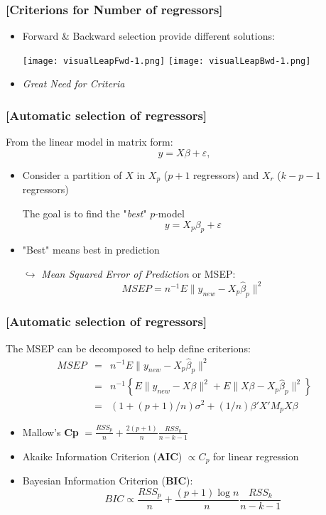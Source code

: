 \documentclass[xcolor=x11names,compress]{beamer}
\renewcommand{\(}{\begin{columns}}
\renewcommand{\)}{\end{columns}}
\newcommand{\<}[1]{\begin{column}{#1}}
\renewcommand{\>}{\end{column}}
\begin{document}
\begin{frame} %
\frametitle{\textcolor{brique}{[Criterions for  Number of regressors]}}

\pause
\begin{itemize}[<+->]
  \item Forward \& Backward selection provide different solutions:
  \item[] \texttt{[image: visualLeapFwd-1.png]} \texttt{[image: visualLeapBwd-1.png]}
  \item \begin{center} \emph{Great Need for Criteria} \end{center}
\end{itemize}
\end{frame}


\begin{frame} %
\frametitle{\textcolor{brique}{[Automatic selection of regressors]}}
From the linear model in matrix form:
$$
 y = X \beta + \varepsilon,
$$
\pause
\begin{itemize}[<+->]
  \item Consider  a partition of $X$ in $X_p$ ($p+1$ regressors) and $X_r$ ($k-p-1$ regressors)
  \item[] The goal is to find the "\textit{best}" $p$-model
      $$
      y = X_p \beta_p + \varepsilon
      $$
  \item "Best" means  best in prediction
  \item[$\hookrightarrow$] \emph{Mean Squared Error of Prediction} or MSEP:
  $$
    MSEP = n^{-1} E \| y_{new} - X_p\widehat{\beta}_p\|^2
  $$
\end{itemize}
\end{frame}


\begin{frame} %
\frametitle{\textcolor{brique}{[Automatic selection of regressors]}}

The MSEP can be decomposed to help define criterions:
\begin{eqnarray*}
MSEP &=& n^{-1} E \| y_{new} - X_p\widehat{\beta}_p\|^2   \\
    &=& n^{-1} \left\{ E \| y_{new} - X{\beta}\|^2 + E \| X{\beta} - X_p\widehat{\beta}_p\|^2  \right\}\\
    &=& (1+(p+1)/n) \sigma^{2} + (1/n) \beta'X' M_p X\beta
\end{eqnarray*}
\pause
\begin{itemize}[<+->]
  \item Mallow's \textbf{Cp}  $ = \frac{RSS_p}{n}  + \frac{2(p+1)}{n} \frac{RSS_k}{n-k-1} $
  \item Akaike Information Criterion (\textbf{AIC})  $\propto C_p$ for linear regression
  \item Bayesian  Information Criterion (\textbf{BIC}): $$ BIC \propto \frac{RSS_p}{n}  + \frac{(p+1) \log n}{n} \frac{RSS_k}{n-k-1} $$
\end{itemize}
\end{frame}
\end{document}
